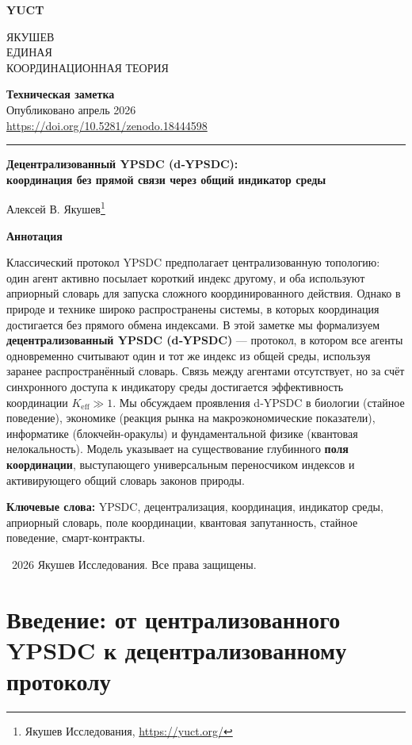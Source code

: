 \documentclass[11pt,a4paper]{article}
\newcommand{\makeheader}{%
	\noindent
	\begin{minipage}{0.17\textwidth}
		\raggedright
		{\sffamily\bfseries\color{skyblue}\fontsize{46}{46}\selectfont YUCT}%
	\end{minipage}%
	\hspace{30pt}
	\begin{minipage}{0.32\textwidth}
		\raggedright
		{\sffamily\fontsize{11}{13}\selectfont ЯКУШЕВ\\ ЕДИНАЯ\\ КООРДИНАЦИОННАЯ ТЕОРИЯ}%
	\end{minipage}%
	\hfill
	\begin{minipage}{0.38\textwidth}
		\raggedleft
		{\sffamily\bfseries Техническая заметка}\\
		{\sffamily Опубликовано апрель 2026}\\
		{\sffamily\footnotesize \scriptsize\url{https://doi.org/10.5281/zenodo.18444598}}%
	\end{minipage}
	\par\vspace{5pt}
	\noindent\textcolor{gold}{\rule{\textwidth}{1.6pt}}
	\par\vspace{0pt}
}
\begin{document}
	\renewcommand{\thepage}{\arabic{page}}
	\thispagestyle{firstpage}
	\makeheader
	
	\vspace{0cm}
	{\LARGE\bfseries Децентрализованный YPSDC (d‑YPSDC): \\ координация без прямой связи через общий индикатор среды \par}
	\vspace{0.2cm}
	
	{\large Алексей В. Якушев\footnote{Якушев Исследования, \url{https://yuct.org/}}} \\
	\vspace{0.0cm}
	
	{\color{darkblue}\textbf{\LARGE Аннотация}} \par
	{\large
		\noindent
		Классический протокол YPSDC предполагает централизованную топологию: один агент активно посылает короткий индекс другому, и оба используют априорный словарь для запуска сложного координированного действия. Однако в природе и технике широко распространены системы, в которых координация достигается без прямого обмена индексами. В этой заметке мы формализуем \textbf{децентрализованный YPSDC (d‑YPSDC)} — протокол, в котором все агенты одновременно считывают один и тот же индекс из общей среды, используя заранее распространённый словарь. Связь между агентами отсутствует, но за счёт синхронного доступа к индикатору среды достигается эффективность координации \(K_{\mathrm{eff}} \gg 1\). Мы обсуждаем проявления d‑YPSDC в биологии (стайное поведение), экономике (реакция рынка на макроэкономические показатели), информатике (блокчейн-оракулы) и фундаментальной физике (квантовая нелокальность). Модель указывает на существование глубинного \textbf{поля координации}, выступающего универсальным переносчиком индексов и активирующего общий словарь законов природы.
	}
	
	\vspace{0.1cm}
	\noindent
	{\color{darkblue}\textbf{Ключевые слова:}} YPSDC, децентрализация, координация, индикатор среды, априорный словарь, поле координации, квантовая запутанность, стайное поведение, смарт-контракты.
	
	\vspace{0.5cm}
	\noindent
	\textcopyright\ 2026 Якушев Исследования. Все права защищены.
	
	\tableofcontents
	\newpage
	
	\section{Введение: от централизованного YPSDC к децентрализованному протоколу}
	
\end{document}
